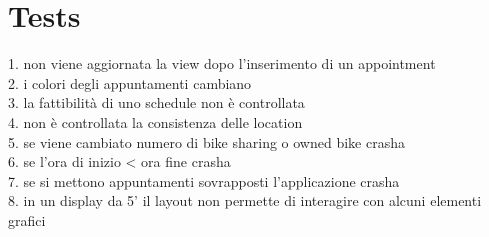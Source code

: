 \chapter{Tests}

1. non viene aggiornata la view dopo l'inserimento di un appointment\\
2. i colori degli appuntamenti cambiano\\
3. la fattibilità di uno schedule non è controllata\\
4. non è controllata la consistenza delle location\\
5. se viene cambiato numero di bike sharing o owned bike crasha\\
6. se l'ora di inizio < ora fine crasha\\
7. se si mettono appuntamenti sovrapposti l'applicazione crasha\\
8. in un display da 5' il layout non permette di interagire con alcuni elementi grafici\\




